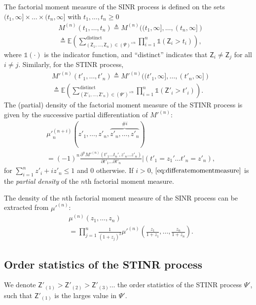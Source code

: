 \documentclass[lettersize,journal]{IEEEtran}
\begin{document}
The factorial moment measure of the SINR process is defined on the sets $(t_1,\infty] \times \dots \times (t_n, \infty]$ with $t_1,\dots,t_n\geq 0$
    \begin{align}
      &M^{(n)}(t_1,\dots,t_n) \triangleq M^{(n)}((t_1,\infty],\dots,(t_n,\infty]) \nonumber \\
          & \triangleq \mathbb{E} \left( \sum^{\text{distinct}}_{\left(\mathsf{Z}_1, \dots, \mathsf{Z}_n \right) \in (\Psi)^{\times n}} \prod_{i=1}^n \mathds{1}(\mathsf{Z}_i >t_i)\right),
    \end{align}
    where $\mathds{1}(\cdot)$ is the indicator function, and ``distinct'' indicates that $\mathsf{Z}_i \neq \mathsf{Z}_j $ for all $i \neq j $. Similarly, for the STINR process,
    \begin{align}
          &M'^{(n)}(t'_1,\dots,t'_n) \triangleq M'^{(n)}((t'_1,\infty],\dots,(t'_n,\infty]) \nonumber \\
              &\triangleq \mathbb{E} \left( \sum^{\text{distinct}}_{\left(\mathsf{Z}'_1, \dots, \mathsf{Z}'_n \right) \in (\Psi')^{\times n}} \prod_{i=1}^n \mathds{1}(\mathsf{Z}'_i >t'_i)\right).
    \end{align}
 The (partial) density of the factorial moment measure of the STINR process is given by the successive partial differentiation of $M'^{(n)}$:
    \begin{align}
      \label{eq:differatemomentmeasure}
     &{\mu'}_n^{(n+i)}(z'_1,\dots,z'_n,\overbrace{z'_n,\dots,z'_n}^{\#i}) \nonumber \\&= (-1)^n \frac{\partial^n M'^{(n)}(t'_1\dots t_n',z'_n \dots z'_n) }{\partial t'_1 \dots \partial t'_n} |(t'_1=z_1'\dots t'_n=z'_n),
    \end{align}
    for $\sum_{i=1}^n z'_i + i z'_n\leq 1$ and $0$ otherwise.  If $i >0$, $\eqref{eq:differatemomentmeasure}$ is the \textit{partial density} of the $n$th factorial moment measure.

    The density of the $n$th factorial moment measure of the SINR process can be extracted from $\mu'^{(n)}$:
    \begin{align}
      \label{eq:densitySINR}
      &\mu^{(n)}(z_1,\dots,z_n) \nonumber\\
      &= \prod_{j=1}^n\frac{1}{(1+z_j)^2}\mu'^{(n)}\left(\frac{z_1}{1+z_1},\dots,\frac{z_n}{1+z_n}\right).
    \end{align}

    
  
\subsection{Order statistics of the STINR process}
We denote $\mathsf{Z}'_{(1)}>\mathsf{Z}'_{(2)} >\mathsf{Z}'_{(3)} \dots$ the order statistics of the STINR process $\Psi'$, such that $\mathsf{Z}'_{(1)}$ is the larges value in $\Psi'$.
\end{document}

